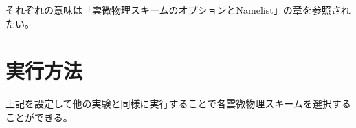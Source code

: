 それぞれの意味は「雲微物理スキームのオプションとNamelist」の章を参照されたい。


\section{実行方法}
上記を設定して他の実験と同様に実行することで各雲微物理スキームを選択することができる。





